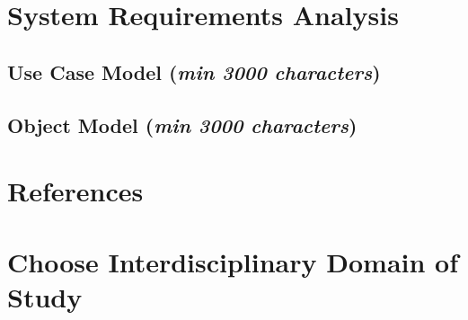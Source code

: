 \documentclass[12pt]{report}
\newcommand{\characters}[1]{(\textit{min #1 characters})}
\begin{document}
\section{System Requirements Analysis}

\subsection{Use Case Model \characters{3000}}
\lipsum[11]

\subsection{Object Model \characters{3000}}
\lipsum[12]

\section{References}
\lipsum[13]

\section{Choose Interdisciplinary Domain of Study}
\lipsum[14]
\end{document}
